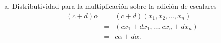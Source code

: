 \begin{enumerate}[\bfseries 1.]
\begin{enumerate}[(1)]
\begin{enumerate}[(a)]
		    \item Distributividad para la multiplicación sobre la adición de escalares
			$$
			\begin{array}{rcl}
			    (c+d)\alpha & = & (c+d)(x_1,x_2,\ldots,x_n)\\
			    & = & (cx_1+dx_1,\ldots,cx_n+dx_n)\\
			    & = & c\alpha+d\alpha.
			\end{array}
			$$

		\end{enumerate}
		\vspace{.5cm}

	\end{enumerate}

\end{enumerate}


